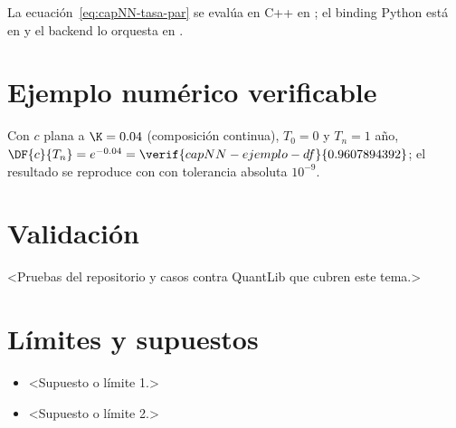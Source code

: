 La ecuación~\eqref{eq:capNN-tasa-par} se evalúa en C++ en
; el binding Python está en
 y el backend lo orquesta en
.

\section{Ejemplo numérico verificable}\label{sec:capNN-ejemplo}

Con $c$ plana a $\K = 0.04$ (composición continua), $T_0 = 0$ y $T_n = 1$ año, $\DF{c}{T_n} = e^{-0.04} =
\verif{capNN-ejemplo-df}{0.9607894392}$; el resultado se reproduce con
 con tolerancia absoluta $10^{-9}$.

\section{Validación}\label{sec:capNN-validacion}

<Pruebas del repositorio y casos contra QuantLib que cubren este tema.>

\section{Límites y supuestos}\label{sec:capNN-limites}
\begin{limites}
  \begin{itemize}
    \item <Supuesto o límite 1.>
    \item <Supuesto o límite 2.>
  \end{itemize}
\end{limites}

